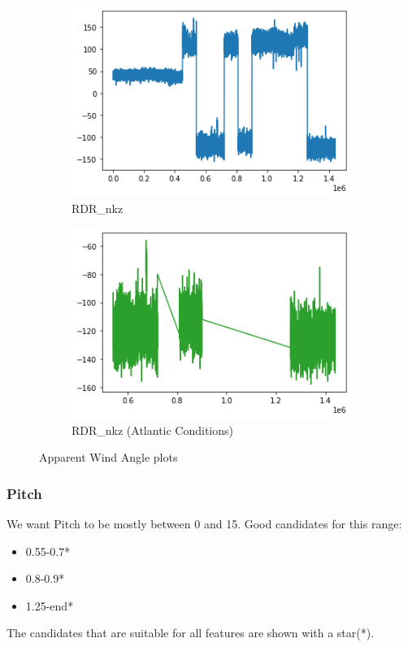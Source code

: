 \begin{figure}[h]
     \centering
     \begin{subfigure}[t]{0.49\textwidth}
         \centering
         \includegraphics[width=\textwidth]{figures/distributions/RDR-AWA.png}
         \caption{RDR\_nkz}
     \end{subfigure}
     \hfill
     \begin{subfigure}[t]{0.49\textwidth}
         \centering
         \includegraphics[width=\textwidth]{figures/distributions/RDR-atlantic-AWA.png}
         \caption{RDR\_nkz (Atlantic Conditions)}
     \end{subfigure}
        \caption{Apparent Wind Angle plots}
\end{figure}

\clearpage
\subsubsection{Pitch}
We want Pitch to be mostly between 0 and 15. Good candidates for this range:
\begin{itemize}
    \item 0.55-0.7*
    \item 0.8-0.9*
    \item 1.25-end*
\end{itemize}
The candidates that are suitable for all features are shown with a star(*).

